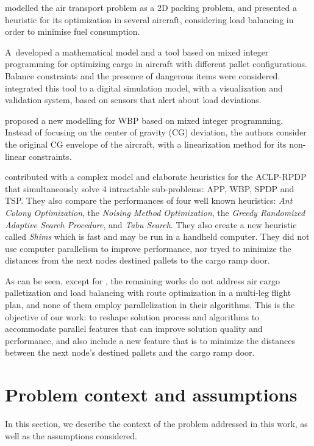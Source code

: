 \documentclass[preprint,authoryear]{elsarticle}
\begin{document}
\cite{YangLiuGao2018} modelled the air transport problem as a 2D packing problem, and presented a heuristic for its optimization in several aircraft, considering load balancing in order to minimise fuel consumption.

\cite{wong2020}A developed a mathematical model and a tool based on mixed integer programming for optimizing cargo in aircraft with different pallet configurations. Balance constraints and the presence of dangerous items were considered. \cite{eugene2021} integrated this tool to a digital simulation model, with a visualization and validation system, based on sensors that alert about load deviations.

\cite{zhao2021} proposed a new modelling for WBP based on mixed integer programming. Instead of focusing on the center of gravity (CG) deviation, the authors consider the original CG envelope of the aircraft, with a linearization method for its non-linear constraints.

\cite{MesquitaSanches2023} contributed with a complex model and elaborate heuristics for the ACLP-RPDP that simultaneously solve 4 intractable sub-problems: APP, WBP, SPDP and TSP. They also compare the performances of four well known heuristics: {\it Ant Colony Optimization}, the {\it Noising Method Optimization}, the {\it Greedy Randomized Adaptive Search Procedure}, and {\it Tabu Search}. They also create a new heuristic called {\it Shims} which is fast and may be run in a handheld computer. They did not use computer parallelism to improve performance, nor tryed to minimize the distances from the next nodes destined pallets to the cargo ramp door.

As can be seen, except for \cite{MesquitaSanches2023}, the remaining works do not address air cargo palletization and load balancing with route optimization in a multi-leg flight plan, and none of them employ parallelization in their algorithms. This is the objective of our work: to reshape \cite{MesquitaSanches2023} solution process and algorithms to accommodate parallel features that can improve solution quality and performance, and also include a new feature that is to minimize the distances between the next node's destined pallets and the cargo ramp door.


\section{Problem context and assumptions}
\label{sec3}

In this section, we describe the context of the problem addressed in this work, as well as the assumptions considered.
\end{document}
